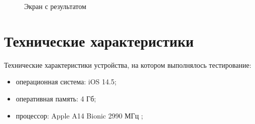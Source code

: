 \begin{figure}[h!]
	\caption{Экран с результатом}
	\label{fig:работа}
\end{figure}

\section{Технические характеристики}

Технические характеристики устройства, на котором выполнялось тестирование:

\begin{itemize}
	\item операционная система: iOS 14.5;
	\item оперативная память: 4 Гб;
	\item процессор: Apple A14 Bionic 2990 МГц \cite{ipad};
\end{itemize}

